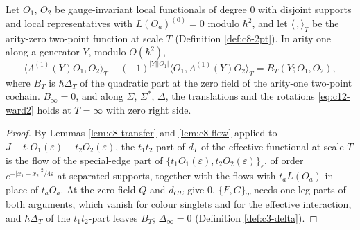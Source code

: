 \begin{lemma}
\label{lem:c12-ward2}
Let $O_1$, $O_2$ be gauge-invariant local functionals of degree $0$ with disjoint supports and local representatives with $L(O_a)^{(0)}=0$ modulo $\hbar^2$, and let $\langle\,,\rangle_T$ be the arity-zero two-point function at scale $T$ (Definition \ref{def:c8-2pt}). In arity one along a generator $Y$, modulo $O(\hbar^2)$,
\begin{equation}
\big\langle\Lambda^{(1)}(Y)O_1,O_2\big\rangle_T+(-1)^{|Y||O_1|}\big\langle O_1,\Lambda^{(1)}(Y)O_2\big\rangle_T=B_T(Y;O_1,O_2),
\label{eq:c12-ward2}
\end{equation}
where $B_T$ is $\hbar\Delta_T$ of the quadratic part at the zero field of the arity-one two-point cochain. $B_\infty=0$, and along $\Sigma$, $\Sigma^*$, $\Delta$, the translations and the rotations \eqref{eq:c12-ward2} holds at $T=\infty$ with zero right side.
\end{lemma}

\begin{proof}
By Lemmas \ref{lem:c8-transfer} and \ref{lem:c8-flow} applied to $J+t_1O_1(\varepsilon)+t_2O_2(\varepsilon)$, the $t_1t_2$-part of $d_T$ of the effective functional at scale $T$ is the flow of the special-edge part of $\{t_1O_1(\varepsilon),t_2O_2(\varepsilon)\}_\varepsilon$, of order $e^{-|x_1-x_2|^2/4\varepsilon}$ at separated supports, together with the flows with $t_aL(O_a)$ in place of $t_aO_a$. At the zero field $Q$ and $d_{CE}$ give $0$, $\{F,G\}_T$ needs one-leg parts of both arguments, which vanish for colour singlets and for the effective interaction, and $\hbar\Delta_T$ of the $t_1t_2$-part leaves $B_T$; $\Delta_\infty=0$ (Definition \ref{def:c3-delta}).
\end{proof}

